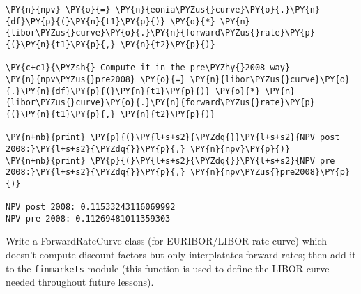 \begin{Answer}
\begin{tcolorbox}[breakable, size=fbox, boxrule=1pt, pad at break*=1mm,colback=cellbackground, colframe=cellborder]
\begin{Verbatim}[commandchars=\\\{\}]
\PY{n}{npv} \PY{o}{=} \PY{n}{eonia\PYZus{}curve}\PY{o}{.}\PY{n}{df}\PY{p}{(}\PY{n}{t1}\PY{p}{)} \PY{o}{*} \PY{n}{libor\PYZus{}curve}\PY{o}{.}\PY{n}{forward\PYZus{}rate}\PY{p}{(}\PY{n}{t1}\PY{p}{,} \PY{n}{t2}\PY{p}{)}

\PY{c+c1}{\PYZsh{} Compute it in the pre\PYZhy{}2008 way}
\PY{n}{npv\PYZus{}pre2008} \PY{o}{=} \PY{n}{libor\PYZus{}curve}\PY{o}{.}\PY{n}{df}\PY{p}{(}\PY{n}{t1}\PY{p}{)} \PY{o}{*} \PY{n}{libor\PYZus{}curve}\PY{o}{.}\PY{n}{forward\PYZus{}rate}\PY{p}{(}\PY{n}{t1}\PY{p}{,} \PY{n}{t2}\PY{p}{)}

\PY{n+nb}{print} \PY{p}{(}\PY{l+s+s2}{\PYZdq{}}\PY{l+s+s2}{NPV post 2008:}\PY{l+s+s2}{\PYZdq{}}\PY{p}{,} \PY{n}{npv}\PY{p}{)}
\PY{n+nb}{print} \PY{p}{(}\PY{l+s+s2}{\PYZdq{}}\PY{l+s+s2}{NPV pre 2008:}\PY{l+s+s2}{\PYZdq{}}\PY{p}{,} \PY{n}{npv\PYZus{}pre2008}\PY{p}{)}

NPV post 2008: 0.11533243116069992
NPV pre 2008: 0.11269481011359303
\end{Verbatim}
\end{tcolorbox}
\end{Answer}

\begin{Exercise}[title={(Forward Rate Curve)}]
Write a ForwardRateCurve class (for EURIBOR/LIBOR rate curve) which
doesn't compute discount factors but only interplatates forward rates;
then add it to the \texttt{finmarkets} module (this function is used to
define the LIBOR curve needed throughout future lessons).
\end{Exercise}

